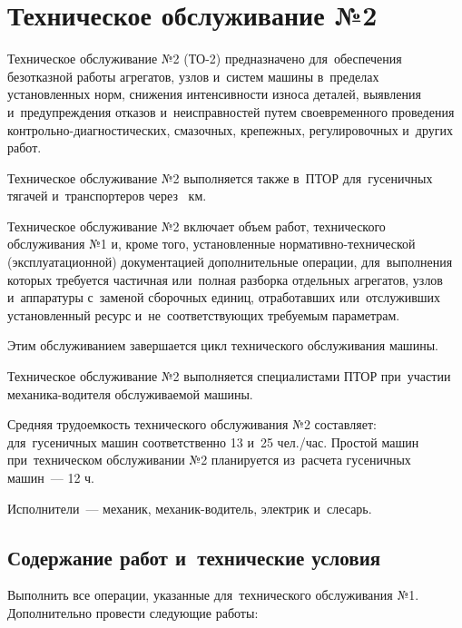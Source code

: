 \section{Техническое обслуживание №2}
Техническое обслуживание №2 (ТО-2) предназначено для~обеспечения безотказной работы агрегатов, узлов и~систем машины в~пределах установленных норм, снижения интенсивности износа деталей, выявления и~предупреждения отказов и~неисправностей путем своевременного проведения контрольно-диагностических, смазочных, крепежных, регулировочных и~других работ.

Техническое обслуживание №2  выполняется также в~ПТОР для~гусеничных тягачей и~транспортеров через ~км.

Техническое обслуживание №2  включает объем работ, технического обслуживания №1 и, кроме того, установленные нормативно-технической (эксплуатационной) документацией дополнительные операции, для~выполнения которых требуется частичная или~полная разборка отдельных агрегатов, узлов и~аппаратуры с~заменой сборочных единиц, отработавших или~отслуживших установленный ресурс и~не~соответствующих требуемым параметрам.

Этим обслуживанием завершается цикл технического обслуживания машины.

Техническое обслуживание №2  выполняется специалистами ПТОР при~участии механика-водителя обслуживаемой машины.

Средняя трудоемкость технического обслуживания №2  составляет: для~гусеничных машин соответственно 13 и~25 чел./час. Простой машин при~техническом обслуживании №2  планируется из~расчета гусеничных машин~--- 12 ч.

Исполнители~--- механик, механик-водитель, электрик и~слесарь. 

\subsection{Содержание работ и~технические условия}
Выполнить все операции, указанные для~технического обслуживания №1. Дополнительно провести следующие работы:

